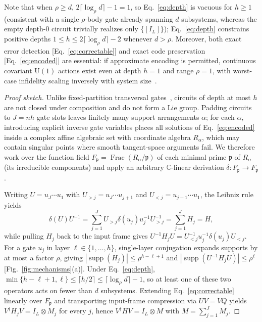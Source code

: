 \documentclass[aps,prl,reprint,notitlepage,nofootinbib,nobibnotes]{revtex4-2}
\newcommand{\UU}{\mathrm U}
\newcommand{\id}{I}
\newcommand{\supp}{\operatorname{supp}}
\begin{document}
Note that when \(\rho\ge d\), \(2\lceil\log_\rho d\rceil-1=1\), so Eq.~\eqref{eq:depth} is vacuous for \(h\ge 1\) (consistent with a single \(\rho\)-body gate already spanning \(d\) subsystems, whereas the empty depth-\(0\) circuit trivially realizes only \(\{[\id_L]\}\)); Eq.~\eqref{eq:depth} constrains positive depths \(1\le h\le 2\lceil\log_\rho d\rceil-2\) whenever \(d>\rho\). Moreover, both exact error detection [Eq.~\eqref{eq:correctable}] and exact code preservation [Eq.~\eqref{eq:encoded}] are essential: if approximate encoding is permitted, continuous covariant \(\UU(1)\) actions exist even at depth \(h=1\) and range \(\rho=1\), with worst-case infidelity scaling inversely with system size~\cite{Faist,WoodsAlhambra,KubicaDemkowicz,ZhouLiuJiang,LiuZhou}.

\begin{proof}[Proof sketch]
Unlike fixed-partition transversal gates~\cite{EK,Faist,LiuZhou}, circuits of depth at most \(h\) are not closed under composition and do not form a Lie group. Padding circuits to \(J=nh\) gate slots leaves finitely many support arrangements \(\alpha\); for each \(\alpha\), introducing explicit inverse gate variables places all solutions of Eq.~\eqref{eq:encoded} inside a complex affine algebraic set with coordinate algebra \(R_\alpha\), which may contain singular points where smooth tangent-space arguments fail. We therefore work over the function field \(F_{\mathfrak p}=\operatorname{Frac}(R_\alpha/\mathfrak p)\) of each minimal prime \(\mathfrak p\) of \(R_\alpha\) (its irreducible components) and apply an arbitrary \(\mathbb C\)-linear derivation \(\delta:F_{\mathfrak p}\to F_{\mathfrak p}\).

Writing \(U=u_J\cdots u_1\) with \(U_{>j}=u_J\cdots u_{j+1}\) and \(U_{<j}=u_{j-1}\cdots u_1\), the Leibniz rule yields
\begin{equation}\label{eq:sketch-generator}
 \delta(U)U^{-1}
  =\sum_{j=1}^J U_{>j}\delta(u_j)u_j^{-1}U_{>j}^{-1}
  =\sum_{j=1}^J H_j=H,
\end{equation}
while pulling \(H_j\) back to the input frame gives \(U^{-1}H_jU=U_{<j}^{-1}u_j^{-1}\delta(u_j)U_{<j}\). For a gate \(u_j\) in layer \(\ell\in\{1,\ldots,h\}\), single-layer conjugation expands supports by at most a factor \(\rho\), giving \(|\supp(H_j)|\le\rho^{h-\ell+1}\) and \(|\supp(U^{-1}H_jU)|\le\rho^\ell\) [Fig.~\ref{fig:mechanisms}(a)]. Under Eq.~\eqref{eq:depth}, \(\min\{h-\ell+1,\ell\}\le\lceil h/2\rceil\le\lceil\log_\rho d\rceil-1\), so at least one of these two operators acts on fewer than \(d\) subsystems. Extending Eq.~\eqref{eq:correctable} linearly over \(F_{\mathfrak p}\) and transporting input-frame compression via \(UV=VQ\) yields \(V^\dagger H_jV=\id_L\otimes M_j\) for every \(j\), hence \(V^\dagger HV=\id_L\otimes M\) with \(M=\sum_{j=1}^J M_j\).


\end{proof}
\end{document}
